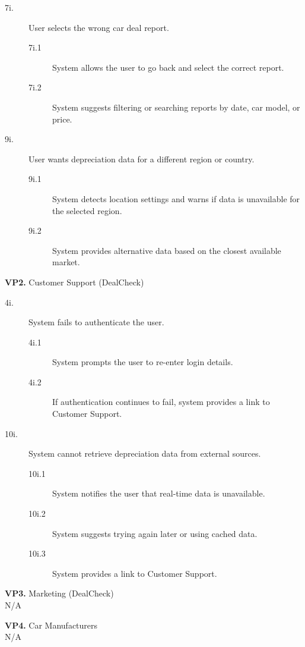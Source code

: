 \documentclass[]{article}
\begin{document}
\begin{enumerate}
\begin{enumerate}[{\bf {BE}1.}]
\begin{description}
			\item[7i.] User selects the wrong car deal report.
			\begin{description}
				\item[7i.1] System allows the user to go back and select the correct report.
				\item[7i.2] System suggests filtering or searching reports by date, car model, or price.
			\end{description}
			
			\item[9i.] User wants depreciation data for a different region or country.
			\begin{description}
				\item[9i.1] System detects location settings and warns if data is unavailable for the selected region.
				\item[9i.2] System provides alternative data based on the closest available market.
			\end{description}
		\end{description}  
		
		\textbf{VP2.} Customer Support (DealCheck)

		\begin{description}
			\item[4i.] System fails to authenticate the user.
			\begin{description}
				\item[4i.1] System prompts the user to re-enter login details.
				\item[4i.2] If authentication continues to fail, system provides a link to Customer Support.
			\end{description}

			\item[10i.] System cannot retrieve depreciation data from external sources.
			\begin{description}
				\item[10i.1] System notifies the user that real-time data is unavailable.
				\item[10i.2] System suggests trying again later or using cached data.
				\item[10i.3] System provides a link to Customer Support.
			\end{description}
		\end{description}

		\textbf{VP3.} Marketing (DealCheck) \\ N/A  

		\textbf{VP4.} Car Manufacturers \\ N/A  


\end{enumerate}
\end{enumerate}
\end{document}
